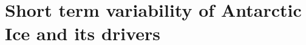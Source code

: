 \documentclass[../main.tex]{subfiles}
\begin{document}
\chapter{Short term variability of Antarctic Ice and its drivers}
\end{document}
